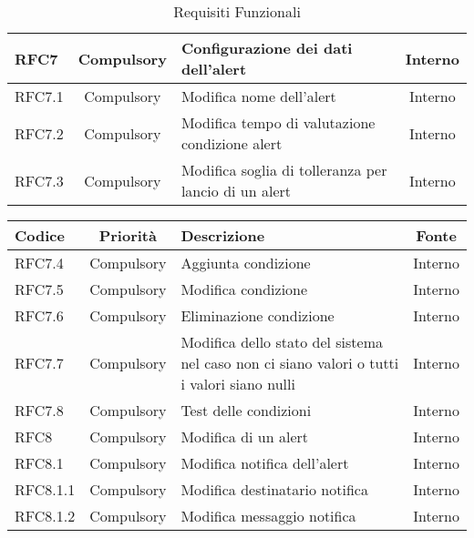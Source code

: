 \begin{table}[!htpb]
\begin{tabular}{|l|c|p{8cm}|c|}
                \hline
                RFC7 & Compulsory & Configurazione dei dati dell'alert & Interno\\
                \hline
                RFC7.1 & Compulsory & Modifica nome dell'alert & Interno\\
                \hline
                RFC7.2 & Compulsory & Modifica tempo di valutazione condizione alert & Interno\\
                \hline
                RFC7.3 & Compulsory & Modifica soglia di tolleranza per lancio di un alert & Interno\\
                \hline
        \end{tabular}
            \caption{Requisiti Funzionali}
        \end{table}
        
        \begin{table}[!htpb]
            \centering
            \renewcommand{\arraystretch}{1.5} %
            \begin{tabular}{|l|c|p{8cm}|c|}
                \rowcolor{orange!50}
        		\hline
        		\textbf{Codice} & \textbf{Priorità} & \textbf{Descrizione} & \textbf{Fonte}\\
                \hline
                RFC7.4 & Compulsory & Aggiunta condizione & Interno\\
                \hline
                RFC7.5 & Compulsory & Modifica condizione & Interno\\
                \hline
                RFC7.6 & Compulsory & Eliminazione condizione & Interno\\
                \hline
                RFC7.7 & Compulsory & Modifica dello stato del sistema nel caso non ci siano valori o tutti i valori siano nulli & Interno\\
                \hline
                RFC7.8 & Compulsory & Test delle condizioni & Interno\\
                \hline
                RFC8 & Compulsory & Modifica di un alert & Interno\\
                \hline
                RFC8.1 & Compulsory & Modifica notifica dell'alert & Interno\\
                \hline
                RFC8.1.1 & Compulsory & Modifica destinatario notifica & Interno\\
                \hline
                RFC8.1.2 & Compulsory & Modifica messaggio notifica & Interno\\

\end{tabular}
\end{table}
